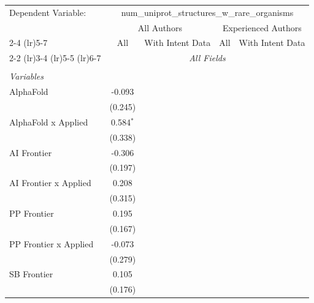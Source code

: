 \begingroup
\centering
\begin{tabular}{lcccccc}
   \tabularnewline \midrule \midrule
   Dependent Variable: & \multicolumn{6}{c}{num\_uniprot\_structures\_w\_rare\_organisms}\\
 & \multicolumn{3}{c}{All Authors} & \multicolumn{3}{c}{Experienced Authors} \\
\cmidrule(lr){2-4} \cmidrule(lr){5-7}
 & \multicolumn{1}{c}{All} & \multicolumn{2}{c}{With Intent Data} & \multicolumn{1}{c}{All} & \multicolumn{2}{c}{With Intent Data} \\
\cmidrule(lr){2-2} \cmidrule(lr){3-4} \cmidrule(lr){5-5} \cmidrule(lr){6-7}
 & \multicolumn{6}{c}{\textit{All Fields}} \\ \\
   \emph{Variables}\\
   AlphaFold             & -0.093         &           &           &        &        &   \\   
                         & (0.245)        &           &           &        &        &   \\   
   AlphaFold x Applied   & 0.584$^{*}$    &           &           &        &        &   \\   
                         & (0.338)        &           &           &        &        &   \\   
   AI Frontier           & -0.306         &           &           &        &        &   \\   
                         & (0.197)        &           &           &        &        &   \\   
   AI Frontier x Applied & 0.208          &           &           &        &        &   \\   
                         & (0.315)        &           &           &        &        &   \\   
   PP Frontier           & 0.195          &           &           &        &        &   \\   
                         & (0.167)        &           &           &        &        &   \\   
   PP Frontier x Applied & -0.073         &           &           &        &        &   \\   
                         & (0.279)        &           &           &        &        &   \\   
   SB Frontier           & 0.105          &           &           &        &        &   \\   
                         & (0.176)        &           &           &        &        &   \\   

\end{tabular}
